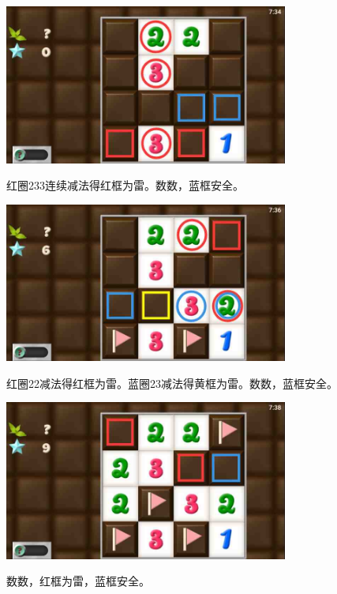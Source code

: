 \subsection{} %
\begin{center}
    \includegraphics[width=0.7\textwidth]{puzzlelow/44-1.jpg}
\end{center}
红圈233连续减法得红框为雷。数数，蓝框安全。
\begin{center}
    \includegraphics[width=0.7\textwidth]{puzzlelow/44-2.jpg}
\end{center}
红圈22减法得红框为雷。蓝圈23减法得黄框为雷。数数，蓝框安全。
\begin{center}
    \includegraphics[width=0.7\textwidth]{puzzlelow/44-3.jpg}
\end{center}
数数，红框为雷，蓝框安全。

